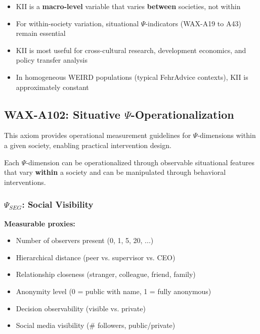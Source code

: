 \begin{itemize}
\item KII is a \textbf{macro-level} variable that varies \textbf{between} societies, not within
\item For within-society variation, situational $\Psi$-indicators (WAX-A19 to A43) remain essential
\item KII is most useful for cross-cultural research, development economics, and policy transfer analysis
\item In homogeneous WEIRD populations (typical FehrAdvice contexts), KII is approximately constant
\end{itemize}




\subsection{WAX-A102: Situative $\Psi$-Operationalization}
\label{sec:wax-a102}

This axiom provides operational measurement guidelines for $\Psi$-dimensions within a given society, enabling practical intervention design.

\begin{axiom}
\label{ax:situative-psi}
Each $\Psi$-dimension can be operationalized through observable situational features that vary \textbf{within} a society and can be manipulated through behavioral interventions.
\end{axiom}

\subsubsection{$\Psi_{SEG}$: Social Visibility}

\textbf{Measurable proxies:}
\begin{itemize}
\item Number of observers present (0, 1, 5, 20, ...)
\item Hierarchical distance (peer vs. supervisor vs. CEO)
\item Relationship closeness (stranger, colleague, friend, family)
\item Anonymity level (0 = public with name, 1 = fully anonymous)
\item Decision observability (visible vs. private)
\item Social media visibility (\# followers, public/private)
\end{itemize}

